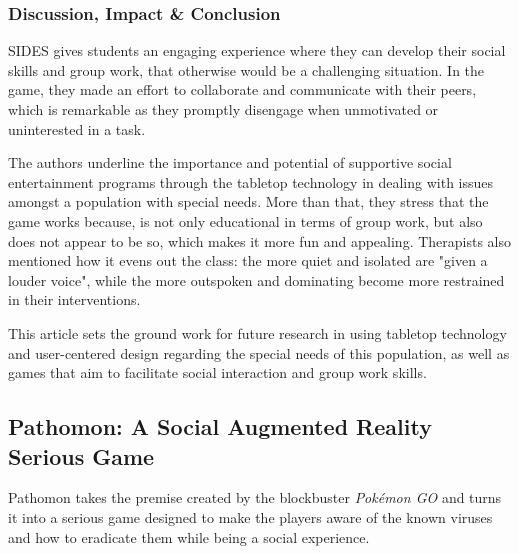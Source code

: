 \documentclass[runningheads]{llncs}
\begin{document}
\subsubsection{Discussion, Impact \& Conclusion}
\par SIDES gives students an engaging experience where they can develop their social skills and group work, that otherwise would be a challenging situation. In the game, they made an effort to collaborate and communicate with their peers, which is remarkable as they promptly disengage when unmotivated or uninterested in a task.
\par The authors underline the importance and potential of supportive social entertainment programs through the tabletop technology in dealing with issues amongst a population with special needs. More than that, they stress that the game works because, is not only educational in terms of group work, but also does not appear to be so, which makes it more fun and appealing. Therapists also mentioned how it evens out the class: the more quiet and isolated are "given a louder voice", while the more outspoken and dominating become more restrained in their interventions.
\par This article sets the ground work for future research in using tabletop technology and user-centered design regarding the special needs of this population, as well as games that aim to facilitate social interaction and group work skills. 

\subsection{Pathomon: A Social Augmented Reality Serious Game}
\par Pathomon takes the premise created by the blockbuster \textit{Pokémon GO} and turns it into a serious game designed to make the players aware of the known viruses and how to eradicate them while being a social experience.
\end{document}
